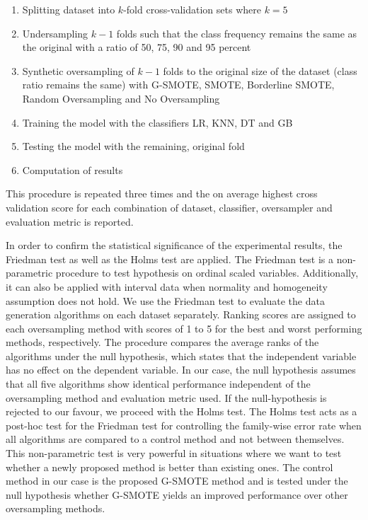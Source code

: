 \documentclass[parskip=full]{scrartcl}
\begin{document}
\begin{enumerate}
	\item 
	Splitting dataset into $\mathit{k}$-fold cross-validation sets where 
	$\mathit{k = 5}$
	\item 
	Undersampling $\mathit{k - 1}$ folds such that the class frequency remains 
	the same as the original with a ratio of 50, 75, 90 and 95 percent
	\item 
	Synthetic oversampling of $\mathit{k - 1}$ folds to the original size of 
	the dataset (class ratio remains the same) with G-SMOTE, SMOTE, Borderline 
	SMOTE, Random Oversampling and No Oversampling
	\item 
	Training the model with the classifiers LR, KNN, DT and GB
	\item 
	Testing the model with the remaining, original fold
	\item 
	Computation of results
\end{enumerate}	

This procedure is repeated three times and the on average highest cross 
validation score for each combination of dataset, classifier, oversampler and 
evaluation metric is reported.

In order to confirm the statistical significance of the experimental results, 
the Friedman test \cite{Sheldon.1996} as well as the Holms test 
\cite{JanezDemsar.2006} are applied. The Friedman test is a non-parametric 
procedure to test hypothesis on ordinal scaled variables. Additionally, it can 
also be applied with interval data when normality and homogeneity assumption 
does not hold. We use the Friedman test to evaluate the data generation 
algorithms on each dataset separately. Ranking scores are assigned to each 
oversampling method with scores of 1 to 5 for the best and worst performing 
methods, respectively. The procedure compares the average ranks of the 
algorithms under the null hypothesis, which states that the independent 
variable has no effect on the dependent variable. In our case, the null 
hypothesis assumes that all five algorithms show identical performance 
independent of the oversampling method and evaluation metric used. If the 
null-hypothesis is rejected to our favour, we proceed with the Holms test. The 
Holms test acts as a post-hoc test for the Friedman test for controlling the 
family-wise error rate when all algorithms are compared to a control method and 
not between themselves. This non-parametric test is very powerful in situations 
where we want to test whether a newly proposed method is better than existing 
ones. The control method in our case is the proposed G-SMOTE method and is 
tested under the null hypothesis whether G-SMOTE yields an improved performance 
over other oversampling methods.
\end{document}
